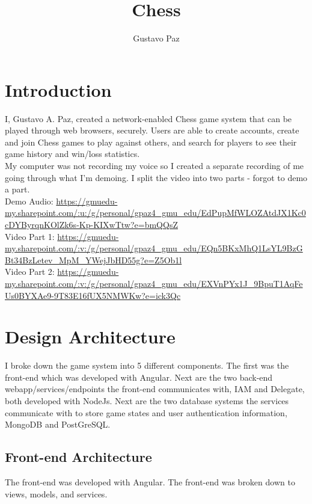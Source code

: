 \documentclass[12pt]{article}
\title{Chess}
\author{Gustavo Paz}
\begin{document}
\maketitle
\section{Introduction}
I, Gustavo A. Paz, created a network-enabled Chess game system that can be played 
through web browsers, securely. Users are able to create accounts, create 
and join Chess games to play against others, and search for players 
to see their game history and win/loss statistics. \\

My computer was not recording my voice so I created a separate recording of me going through what I'm demoing. I split the video into two parts - forgot to demo a part.\\
Demo Audio: \url{https://gmuedu-my.sharepoint.com/:u:/g/personal/gpaz4_gmu_edu/EdPupMfWLOZAtdJX1Kc0cDYByrqnKOlZk6s-Kp-KIXwTtw?e=bmQQsZ}\\
Video Part 1: \url{https://gmuedu-my.sharepoint.com/:v:/g/personal/gpaz4_gmu_edu/EQn5BKxMhQ1LsYL9BzGBt34BzLetev_MpM_YWejJbHD55g?e=Z5Ob1l}\\
Video Part 2: \url{https://gmuedu-my.sharepoint.com/:v:/g/personal/gpaz4_gmu_edu/EXVnPYx1J_9BpuT1AqFeUs0BYXAe9-9T83E16fUX5NMWKw?e=ick3Qc}\\
\maketitle
\section{Design Architecture}
I broke down the game system into 5 different components. The first was the front-end 
which was developed with Angular. Next are the two back-end webapp/services/endpoints the front-end
communicates with, IAM and Delegate, both developed with NodeJs. Next are the two database systems
the services communicate with to store game states and user authentication information, MongoDB 
and PostGreSQL.
\subsection{Front-end Architecture}
The front-end was developed with Angular. The front-end was broken down to views, models, and services.
\end{document}
